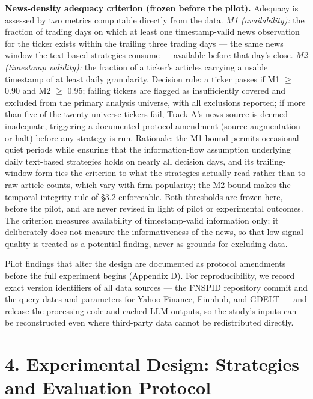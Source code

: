\documentclass[
  12pt,
]{article}
\begin{document}
\textbf{News-density adequacy criterion (frozen before the pilot).}
Adequacy is assessed by two metrics computable directly from the data.
\emph{M1 (availability):} the fraction of trading days on which at least
one timestamp-valid news observation for the ticker exists within the
trailing three trading days --- the same news window the text-based
strategies consume --- available before that day's close. \emph{M2
(timestamp validity):} the fraction of a ticker's articles carrying a
usable timestamp of at least daily granularity. Decision rule: a ticker
passes if M1 \(\geq\) 0.90 and M2 \(\geq\) 0.95; failing tickers are
flagged as insufficiently covered and excluded from the primary analysis
universe, with all exclusions reported; if more than five of the twenty
universe tickers fail, Track A's news source is deemed inadequate,
triggering a documented protocol amendment (source augmentation or halt)
before any strategy is run. Rationale: the M1 bound permits occasional
quiet periods while ensuring that the information-flow assumption
underlying daily text-based strategies holds on nearly all decision
days, and its trailing-window form ties the criterion to what the
strategies actually read rather than to raw article counts, which vary
with firm popularity; the M2 bound makes the temporal-integrity rule of
§3.2 enforceable. Both thresholds are frozen here, before the pilot, and
are never revised in light of pilot or experimental outcomes. The
criterion measures availability of timestamp-valid information only; it
deliberately does not measure the informativeness of the news, so that
low signal quality is treated as a potential finding, never as grounds
for excluding data.

Pilot findings that alter the design are documented as protocol
amendments before the full experiment begins (Appendix D). For
reproducibility, we record exact version identifiers of all data sources
--- the FNSPID repository commit and the query dates and parameters for
Yahoo Finance, Finnhub, and GDELT --- and release the processing code
and cached LLM outputs, so the study's inputs can be reconstructed even
where third-party data cannot be redistributed directly.

\hypertarget{experimental-design-strategies-and-evaluation-protocol}{%
\section{4. Experimental Design: Strategies and Evaluation
Protocol}\label{experimental-design-strategies-and-evaluation-protocol}}
\end{document}
